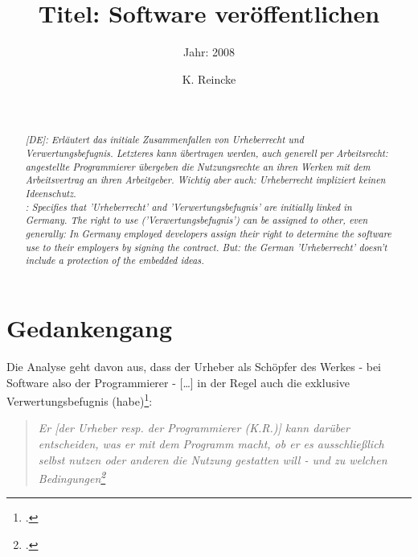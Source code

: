 \documentclass[DIV=calc,BCOR=5mm,11pt,headings=small,oneside,abstract=true, toc=bib]{scrartcl}
\begin{document}

\titlehead{Literaturexzerpt}
\subject{Autor(en): Kreutzer}
\title{Titel: Software veröffentlichen}
\subtitle{Jahr: 2008 }
\author{K. Reincke}
\maketitle

\begin{abstract}
\noindent
\cite[(in:)][]{DjoGehGraKreSpi2008a} \\
\noindent
\cite[(ist:)][163 - 167]{Kreutzer2008b} \\
\noindent \itshape
[DE]: Erläutert das initiale Zusammenfallen von Urheberrecht und
Verwertungsbefugnis. Letzteres kann übertragen werden, auch generell per
Arbeitsrecht: angestellte Programmierer übergeben die Nutzungsrechte an ihren
Werken mit dem Arbeitsvertrag an ihren Arbeitgeber. Wichtig aber auch:
Urheberrecht impliziert keinen Ideenschutz. \\
\noindent
[EN]: Specifies that 'Urheberrecht' and 'Verwertungsbefugnis' are initially
linked in Germany. The right to use ('Verwertungsbefugnis') can be assigned to
other, even generally: In Germany employed developers assign their right to
determine the software use to their employers by signing the contract. But: the
German 'Urheberrecht' doesn't include a protection of the embedded ideas.
\end{abstract}
\footnotesize
\normalsize

\section{Gedankengang}

Die Analyse geht davon aus, dass der Urheber als \glqq{}Schöpfer des
Werkes\grqq{} - bei Software also der Programmierer - \glqq{}[\ldots] in der
Regel auch die exklusive Verwertungsbefugnis
(habe)\grqq{}\footcite[vgl.][163]{Kreutzer2008b}:

\begin{quote}{\itshape \glqq{}Er [der Urheber resp. der Programmierer (K.R.)]
kann darüber entscheiden, was er mit dem Programm macht, ob er es ausschließlich
selbst nutzen oder anderen die Nutzung gestatten will - und zu welchen
Bedingungen\grqq{}\footcite[][163]{Kreutzer2008b}}\end{quote}
\end{document}
